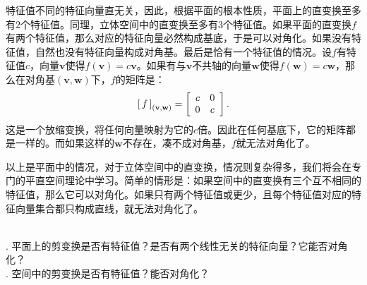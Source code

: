 \documentclass[12pt,UTF8]{ctexbook}
\begin{document}
特征值不同的特征向量直无关，因此，根据平面的根本性质，平面上的直变换至多有$2$个特征值。同理，立体空间中的直变换至多有$3$个特征值。如果平面的直变换$f$有两个特征值，那么对应的特征向量必然构成基底，于是可以对角化。如果没有特征值，自然也没有特征向量构成对角基。最后是恰有一个特征值的情况。设$f$有特征值$c$，向量$\mathbf{v}$使得$f(\mathbf{v}) = c\mathbf{v}$。如果有与$\mathbf{v}$不共轴的向量$\mathbf{w}$使得$f(\mathbf{w}) = c\mathbf{w}$，那么在对角基$(\mathbf{v},\mathbf{w})$下，$f$的矩阵是：
$$
\bmat{f}[(\mathbf{v},\mathbf{w})] = \begin{bmatrix}
    \phantom{0}c&0\phantom{0}\\\phantom{0}0&c\phantom{0}
\end{bmatrix}.
$$
这是一个放缩变换，将任何向量映射为它的$c$倍。因此在任何基底下，它的矩阵都是一样的。而如果这样的$\mathbf{w}$不存在，凑不成对角基，$f$就无法对角化了。

以上是平面中的情况，对于立体空间中的直变换，情况则复杂得多，我们将会在专门的平直空间理论中学习。简单的情形是：如果空间中的直变换有三个互不相同的特征值，那么它可以对角化。如果只有两个特征值或更少，且每个特征值对应的特征向量集合都只构成直线，就无法对角化了。

\begin{sk}
    \mbox{} \\
    . 平面上的剪变换是否有特征值？是否有两个线性无关的特征向量？它能否对角化？\\
    . 空间中的剪变换是否有特征值？能否对角化？
\end{sk}
\end{document}
